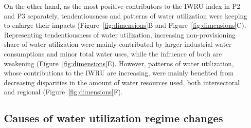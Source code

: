 \documentclass[9pt, twocolumn, twoside, lineno]{pnas-new}
\begin{document}
On the other hand, as the most positive contributors to the IWRU index in P2 and P3 separately, tendentiousness and patterns of water utilization were keeping to enlarge their impacts (Figure~\ref{fig:dimensions}B and Figure~\ref{fig:dimensions}C). 
Representing tendentiousness of water utilization, increasing non-provisioning share of water utilization were mainly contributed by larger industrial water consumptions and minor total water uses, while the influence of both are weakening (Figure~\ref{fig:dimensions}E).
However, patterns of water utilization, whose contributions to the IWRU are increasing, were mainly benefited from decreasing disparities in the amount of water resources used, both intersectoral and regional (Figure~\ref{fig:dimensions}F).


\subsection*{Causes of water utilization regime changes}
\end{document}
